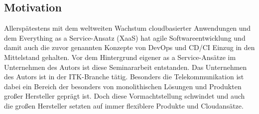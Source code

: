 \subsection{Motivation}
\label{Motivation}
Allerspätestens mit dem weltweiten Wachstum cloudbasierter Anwendungen und dem \glqq{}Everything as a Service\grqq{}-Ansatz (\acrshort{XaaS}) hat agile Softwareentwicklung und damit auch die zuvor genannten Konzepte von \acrshort{DevOps} und \acrshort{CD}/\acrshort{CI} Einzug in den Mittelstand gehalten. Vor dem Hintergrund eigener \glqq{}as a Service\grqq{}-Ansätze im Unternehmen des Autors ist diese Seminararbeit entstanden. Das Unternehmen des Autors ist in der \acrshort{ITK}-Branche tätig. Besonders die Telekommunikation ist dabei ein Bereich der besonders von monolithischen Lösungen und Produkten großer Hersteller geprägt ist.  Doch diese Vormachtstellung schwindet und auch die großen Hersteller setzten auf immer flexiblere Produkte und Cloudansätze.
